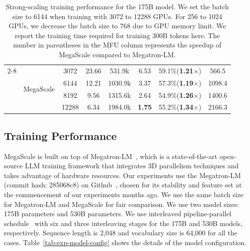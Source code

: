 \documentclass[letterpaper,twocolumn,10pt]{article}
\newcommand{\sysname}{MegaScale\xspace}
\newcommand{\revision}[1]{{#1}}
\begin{document}
\begin{table}[ht]
\begin{tabular}{|c|c|c|c|c|c|c|c|}
        \cline{2-8}
                                & \multirow{4}{*}{\sysname} & 3072  & 23.66 & 531.9k  & 6.53 & 59.1\%(\textbf{1.21$\times$}) & 566.5 \\
                                &                           & 6144  & 12.21 & 1030.9k & 3.37 & 57.3\%(\textbf{1.19$\times$}) & 1098.4 \\
                                &                           & 8192  & 9.56  & 1315.6k & 2.64 & 54.9\%(\textbf{1.26$\times$}) & 1400.6 \\
                                &                           & 12288 & 6.34  & 1984.0k & \textbf{1.75} & 55.2\%(\textbf{1.34$\times$}) & 2166.3 \\
        \hline
    \end{tabular}
    \caption{Strong-scaling training performance for the 175B model. We set the batch size to 6144 when training with 3072 to 12288 GPUs. For 256 to 1024 GPUs, we decrease the batch size to 768 due to GPU memory limit. We report the training time required for training 300B tokens here. The number in parentheses in the MFU column represents the speedup of \sysname compared to Megatron-LM.}
    \label{tab:exp-175b-scaling}
\end{table}

\subsection{Training Performance}

\revision{\sysname is built on top of Megatron-LM~\cite{narayanan2021efficient}, which is a state-of-the-art
open-source LLM training framework that integrates 3D parallelism techniques and
takes advantage of hardware resources.} Our experiments use the \revision{Megatron-LM (commit hash: 285068c8) on Github~\cite{megatrongithub}, chosen for its stability and feature set at the commencement of our experiments months ago.
} We use the same batch size for Megatron-LM and
\sysname for fair comparison. We use two model sizes: 175B parameters and 530B
parameters. We use interleaved pipeline-parallel
schedule~\cite{korthikanti2023reducing} with six and three interleaving stages
for the 175B and 530B models, respectively. Sequence length is 2,048 and
vocabulary size is 64,000 for all the cases. Table~\ref{tab:exp-model-config}
shows the details of the model configuration.
\end{document}
